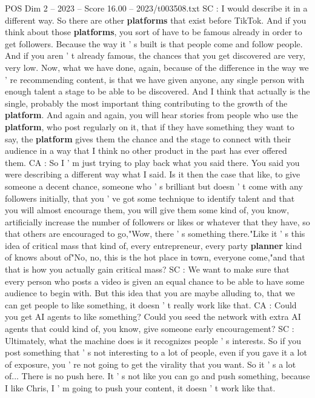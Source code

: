 \begin{textsample}{POS Dim 2 – 2023 – Score 16.00 – 2023/t003508.txt}
SC : I would describe it in a different way.
So there are other \textbf{platforms} that exist before TikTok.
And if you think about those \textbf{platforms}, you sort of have to be famous already in order to get followers.
Because the way it ' s built is that people come and follow people.
And if you aren ' t already famous, the chances that you get discovered are very, very low.
Now, what we have done, again, because of the difference in the way we ' re recommending content, is that we have given anyone, any single person with enough talent a stage to be able to be discovered.
And I think that actually is the single, probably the most important thing contributing to the growth of the \textbf{platform}.
And again and again, you will hear stories from people who use the \textbf{platform}, who post regularly on it, that if they have something they want to say, the \textbf{platform} gives them the chance and the stage to connect with their audience in a way that I think no other product in the past has ever offered them.
CA : So I ' m just trying to play back what you said there.
You said you were describing a different way what I said.
Is it then the case that like, to give someone a decent chance, someone who ' s brilliant but doesn ' t come with any followers initially, that you ' ve got some technique to identify talent and that you will almost encourage them, you will give them some kind of, you know, artificially increase the number of followers or likes or whatever that they have, so that others are encouraged to go,"Wow, there ' s something there."Like it ' s this idea of critical mass that kind of, every entrepreneur, every party \textbf{planner} kind of knows about of"No, no, this is the hot place in town, everyone come,"and that that is how you actually gain critical mass?
SC : We want to make sure that every person who posts a video is given an equal chance to be able to have some audience to begin with.
But this idea that you are maybe alluding to, that we can get people to like something, it doesn ' t really work like that.
CA : Could you get AI agents to like something?
Could you seed the network with extra AI agents that could kind of, you know, give someone early encouragement?
SC : Ultimately, what the machine does is it recognizes people ' s interests.
So if you post something that ' s not interesting to a lot of people, even if you gave it a lot of exposure, you ' re not going to get the virality that you want.
So it ' s a lot of...
There is no push here.
It ' s not like you can go and push something, because I like Chris, I ' m going to push your content, it doesn ' t work like that.

\end{textsample}
